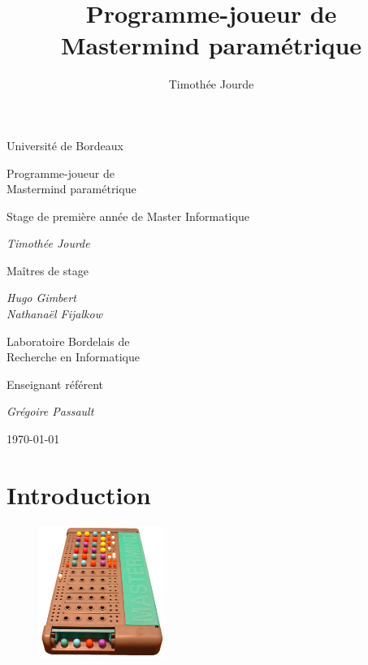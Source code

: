 \documentclass[a4paper]{article}
\title{Programme-joueur de \\ Mastermind paramétrique}
\author{Timothée Jourde}
\renewcommand{\(}{\begin{math}\color{brick}}
\renewcommand{\)}{\end{math}}
\newcommand{\ttl}[1]{{\Large\color{brick}#1}}
\newcommand{\vsp}{\vspace{0.3cm}}
\begin{document}
\setlength{\abovedisplayskip}{0pt}
\setlength{\belowdisplayskip}{0pt}
\setlength{\abovedisplayshortskip}{0pt}
\setlength{\belowdisplayshortskip}{0pt}



\begin{titlepage}
  \centering
  \large

  {
    Université de Bordeaux
  }
  
  \vfill

  {
    \ttl{\Huge Programme-joueur de \\ Mastermind paramétrique}

    \vsp
    
    \ttl{Stage de première année de Master Informatique}
  }
  
  \vfill

  {
    \textit{Timothée Jourde}
  }
         
  \vfill

  {
    \ttl{Maîtres de stage}
    
    \vsp
    
    \textit{Hugo Gimbert \\ Nathanaël Fijalkow}
    
    \vsp
    
    Laboratoire Bordelais de \\ Recherche en Informatique
  }
  
  \vfill

  {
    \ttl{Enseignant référent}
    
    \vsp
    
    \textit{Grégoire Passault}
  }
  
  \vfill

  {
    \today
  }
\end{titlepage}

\clearpage

{\color{brick}\tableofcontents}

\section{Introduction}

\begin{figure}
  \vspace{-\baselineskip}
  \includegraphics[width=11em]{mastermind.png}
\end{figure}
\end{document}
